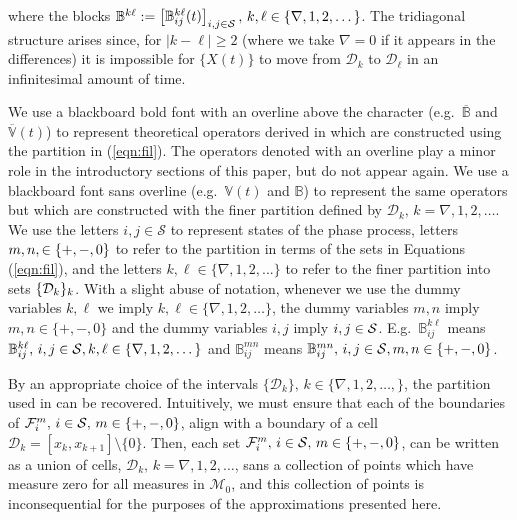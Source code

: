 where the blocks \(\mathbb B^{k\ell}:= \begin{bmatrix} \mathbb B_{ij}^{k\ell}(t) \end{bmatrix}_{i,j\in\mathcal S},\,k,\ell\in\{\nabla,1,2,\dots\}\). 
The tridiagonal structure arises since, for \(|k-\ell|\geq2\) (where we take \(\nabla = 0\) if it appears in the differences) it is impossible for \(\{X(t)\}\) to move from \(\mathcal D_k\) to \(\mathcal D_\ell\) in an infinitesimal amount of time. 

\begin{rem}\label{remark: notation 2} We use a blackboard bold font with an overline above the character (e.g.~\(\overline{\mathbb B}\) and \(\overline{\mathbb V}(t)\)) to represent theoretical operators derived in \citep{bo2014} which are constructed using the partition in (\ref{eqn:fil}). The operators denoted with an overline play a minor role in the introductory sections of this paper, but do not appear again. We use a blackboard font sans overline (e.g.~\(\mathbb V(t)\) and \(\mathbb B\)) to represent the same operators but which are constructed with the finer partition defined by \(\mathcal D_k,\,k=\nabla,1,2,\dots\). We use the letters \(i,j\in\mathcal S\) to represent states of the phase process, letters \(m,n,\in\mathcal \{+,-,0\}\) to refer to the partition in terms of the sets in Equations (\ref{eqn:fil}), and the letters \(k,\ell\in\{\nabla,1,2,...\}\) to refer to the finer partition into sets \(\{\mathcal{D}_k\}_k\). With a slight abuse of notation, whenever we use the dummy variables \(k,\ell\) we imply \(k,\ell\in\{\nabla,1,2,\dots\}\), the dummy variables \(m,n\) imply \(m,n\in\{+,-,0\}\) and the dummy variables \(i,j\) imply \(i,j\in\mathcal{S}\). E.g.~\(\mathbb B_{ij}^{k\ell}\) means \(\mathbb B_{ij}^{k\ell},\, i,j\in\mathcal{S}, k,\ell\in\{\nabla,1,2,\dots\}\) and \(\mathbb B_{ij}^{mn}\) means \(\mathbb B_{ij}^{mn},\, i,j\in\mathcal{S}, m,n\in\{+,-,0\}\).
\end{rem}

By an appropriate choice of the intervals \(\{\mathcal D_k\},\, k\in\{\nabla,1,2,\dots,\}\), the partition used in \citep{bo2014} can be recovered. Intuitively, we must ensure that each of the boundaries of \(\mathcal{F}_i^m,\, i\in\mathcal{S},\,m\in\{+,-,0\}\), align with a boundary of a cell \(\mathcal D_k=[x_k,x_{k+1}]\setminus\{0\}\). Then, each set \(\mathcal{F}_i^m,\, i\in\mathcal{S},\,m\in\{+,-,0\}\), can be written as a union of cells, \(\mathcal D_k,\,k=\nabla,1,2,\dots\), sans a collection of points which have measure zero for all measures in \(\mathcal M_0\), and this collection of points is inconsequential for the purposes of the approximations presented here. 

